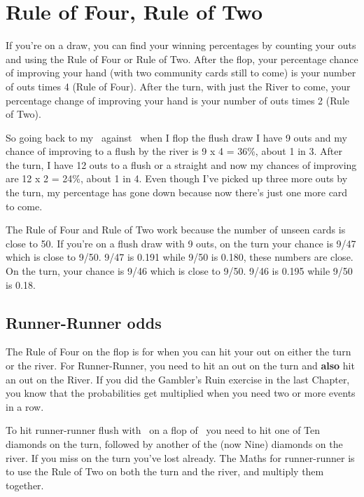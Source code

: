 
\section{Rule of Four, Rule of Two}

If you're on a draw, you can find your winning percentages by counting
your outs and using the Rule of Four or Rule of Two. After the flop,
your percentage chance of improving your hand (with two community
cards still to come) is your number of outs
times 4 (Rule of Four). After the turn, with just the River to come,
your percentage change of improving your hand is your number of outs
times 2 (Rule of Two).

So going back to my \fourd\tred\ against \Ah\Jc\, when I flop the
flush draw I have 9 outs and my chance of improving to a flush by the
river is 9 x 4 = 36\%, about 1 in 3. After the turn, I have 12 outs to
a flush or a straight and now my chances of improving are 12 x 2 =
24\%, about 1 in 4. Even though I've picked up three more outs by the
turn, my percentage has gone down because now there's just one more
card to come.

The Rule of Four and Rule of Two work because the number of unseen
cards is close to 50. If you're on a flush draw with 9 outs, on the
turn your chance is 9/47 which is close to 9/50. 9/47 is 0.191 while
9/50 is 0.180, these numbers are close. On the turn, your chance is
9/46 which is close to 9/50. 9/46 is 0.195 while 9/50 is 0.18.

\subsection{Runner-Runner odds}

The Rule of Four on the flop is for when you can hit your out on
either the turn or the river. For Runner-Runner, you need to hit an
out on the turn and \textbf{also} hit an out on the River. If you did
the Gambler's Ruin exercise in the last Chapter, you know that the
probabilities get multiplied when you need two or more events in a
row.

To hit runner-runner flush with \eigd\fourd\ on a flop of \Ad\Qh\ninec\,
you need to hit one of Ten diamonds on the turn, followed by another
of the (now Nine) diamonds on the river. If you miss on the turn
you've lost already. The Maths for runner-runner is to use the Rule of
Two on both the turn and the river, and multiply them together.

